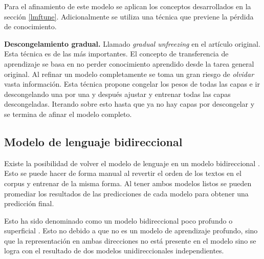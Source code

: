 Para el afinamiento de este modelo se aplican los conceptos desarrollados en la sección \ref{lmftune}. Adicionalmente se utiliza una técnica que previene la pérdida de conocimiento.

\textbf{Descongelamiento gradual.} Llamado \emph{gradual unfreezing} en el artículo original. Esta técnica es de las más importantes. El concepto de transferencia de aprendizaje se basa en no perder conocimiento aprendido desde la tarea general original. Al refinar un modelo completamente se toma un gran riesgo de \emph{olvidar} vasta información. Esta técnica propone congelar los pesos de todas las capas e ir descongelando una por una y después ajustar y entrenar todas las capas descongeladas. Iterando sobre esto hasta que ya no hay capas por descongelar y se termina de afinar el modelo completo.

\subsection{Modelo de lenguaje bidireccional}

Existe la posibilidad de volver el modelo de lenguaje en un modelo bidireccional \parencite{howard2018}. Esto se puede hacer de forma manual al revertir el orden de los textos en el corpus y entrenar de la misma forma. Al tener ambos modelos listos se pueden promediar los resultados de las predicciones de cada modelo para obtener una predicción final.

Esto ha sido denominado como un modelo bidireccional poco profundo o superficial \parencite{devlin2018bert}. Esto no debido a que no es un modelo de aprendizaje profundo, sino que la representación en ambas direcciones no está presente en el modelo sino se logra con el resultado de dos modelos unidireccionales independientes.
